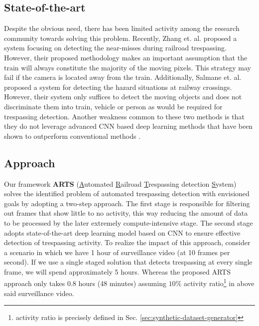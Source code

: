 \subsection{State-of-the-art}
Despite the obvious need, there has been limited activity among the research community towards solving this problem. Recently, Zhang et. al. \cite{zhang2018automated} proposed a system focusing on detecting the near-misses during railroad trespassing. However, their proposed methodology makes an important assumption that the train will always constitute the majority of the moving pixels. This strategy may fail if the camera is located away from the train. Additionally, Salmane et. al. \cite{salmane2015video} proposed a system for detecting the hazard situations at railway crossings. However, their system only suffices to detect the moving objects and does not discriminate them into train, vehicle or person as would be required for trespassing detection. Another weakness common to these two methods is that they do not leverage advanced CNN based deep learning methods that have been shown to outperform conventional methods \cite{krizhevsky2012imagenet}. 

\subsection{Approach}
Our framework \textbf{ARTS} (\underline{A}utomated \underline{R}ailroad \underline{T}respassing detection \underline{S}ystem) solves the identified problem of automated trespassing detection with envisioned goals by adopting a two-step approach. The first stage is responsible for filtering out frames that show little to no activity, this way reducing the amount of data to be processed by the later extremely compute-intensive stage. The second stage adopts state-of-the-art deep learning model based on CNN to ensure effective detection of trespassing activity. To realize the impact of this approach, consider a scenario in which we have 1 hour of surveillance video (at 10 frames per second). If we use a single staged solution that detects trespassing at every single frame, we will spend approximately 5 hours. Whereas the proposed ARTS approach only takes 0.8 hours (48 minutes) assuming $10\%$ activity ratio\footnote{activity ratio is precisely defined in Sec. \ref{sec:synthetic-dataset-generator}} in above said surveillance video. 
